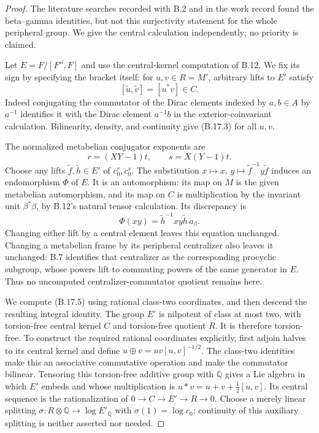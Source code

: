 \begin{proof}
The literature searches recorded with B.2 and in the work record
found the beta--gamma identities, but not this surjectivity
statement for the whole peripheral group. We give the central
calculation independently; no priority is claimed.

Let $E=F/\overline{[F'',F]}$ and use the central-kernel computation
of B.12. We fix its sign by specifying the bracket itself:
for $u,v\in R=M'$, arbitrary lifts to $E'$ satisfy
\[
             [\widetilde u,\widetilde v]=[u^*v]\in C.
 \tag{B.17.3}
\]
Indeed conjugating the commutator of the Dirac elements indexed
by $a,b\in A$ by $a^{-1}$ identifies it with the Dirac element
$a^{-1}b$ in the exterior-coinvariant calculation. Bilinearity,
density, and continuity give (B.17.3) for all $u,v$.

The normalized metabelian conjugator exponents are
\[
             r=(XY-1)t,\qquad s=X(Y-1)t.
 \tag{B.17.4}
\]
Choose any lifts $\widetilde f,\widetilde h\in E'$ of
$c_0^r,c_0^s$. The substitution $x\mapsto x$,
$y\mapsto\widetilde f^{-1}y\widetilde f$ induces an
endomorphism $\Phi$ of $E$. It is an automorphism: its map on
$M$ is the given metabelian automorphism, and its map on $C$
is multiplication by the invariant unit $\beta^*\beta$, by
B.12's natural tensor calculation. Its discrepancy is
\[
             \Phi(xy)=\widetilde h^{-1}xy\widetilde h\,a_\beta.
 \tag{B.17.5}
\]
Changing either lift by a central element leaves this equation
unchanged. Changing a metabelian frame by its peripheral
centralizer also leaves it unchanged: B.7 identifies that
centralizer as the corresponding procyclic subgroup, whose
powers lift to commuting powers of the same generator in $E$.
Thus no uncomputed centralizer-commutator quotient remains here.

We compute (B.17.5) using rational class-two coordinates, and
then descend the resulting integral identity. The group $E'$ is
nilpotent of class at most two, with torsion-free central kernel
$C$ and torsion-free quotient $R$. It is therefore torsion-free.
To construct the required rational coordinates explicitly, first
adjoin halves to its central kernel and define
$u\mathbin\oplus v=uv[u,v]^{-1/2}$. The class-two identities
make this an associative commutative operation and make the
commutator bilinear. Tensoring this torsion-free additive group
with $\mathbb Q$ gives a Lie algebra in which $E'$ embeds and
whose multiplication is $u*v=u+v+\tfrac12[u,v]$.
Its central sequence is the rationalization of
$0\to C\to E'\to R\to0$. Choose a merely linear splitting
$\sigma:R\otimes\mathbb Q\to\log E'_{\mathbb Q}$ with
$\sigma(1)=\log c_0$; continuity of this auxiliary splitting
is neither asserted nor needed.


\end{proof}
